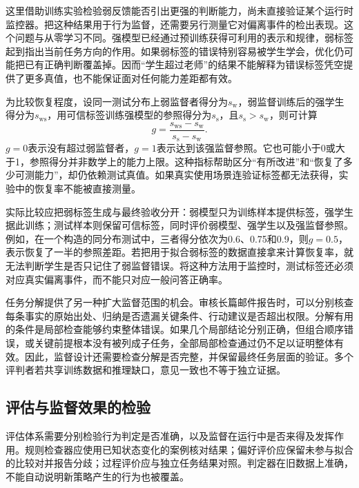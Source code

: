 这里借助训练实验检验弱反馈能否引出更强的判断能力，尚未直接验证某个运行时监控器。把这种结果用于行为监督，还需要另行测量它对偏离事件的检出表现。这个问题与从零学习不同。强模型已经通过预训练获得可利用的表示和规律，弱标签起到指出当前任务方向的作用。如果弱标签的错误特别容易被学生学会，优化仍可能把已有正确判断覆盖掉。因而“学生超过老师”的结果不能解释为错误标签凭空提供了更多真值，也不能保证面对任何能力差距都有效。

为比较恢复程度，设同一测试分布上弱监督者得分为$s_{\mathrm{w}}$，弱监督训练后的强学生得分为$s_{\mathrm{ws}}$，用可信标签训练强模型的参照得分为$s_{\mathrm{s}}$，且$s_{\mathrm{s}}>s_{\mathrm{w}}$，则可计算
\begin{equation}
 g=\frac{s_{\mathrm{ws}}-s_{\mathrm{w}}}
          {s_{\mathrm{s}}-s_{\mathrm{w}}}.
 \label{eq:alignment-weak-strong-recovery}
\end{equation}
$g=0$表示没有超过弱监督者，$g=1$表示达到该强监督参照。它也可能小于0或大于1，参照得分并非数学上的能力上限。这种指标帮助区分“有所改进”和“恢复了多少可测能力”，却仍依赖测试真值。如果真实使用场景连验证标签都无法获得，实验中的恢复率不能被直接测量。

实际比较应把弱标签生成与最终验收分开：弱模型只为训练样本提供标签，强学生据此训练；测试样本则保留可信标签，同时评价弱模型、强学生以及强监督参照。例如，在一个构造的同分布测试中，三者得分依次为0.6、0.75和0.9，则$g=0.5$，表示恢复了一半的参照差距。若把用于拟合弱标签的数据直接拿来计算恢复率，就无法判断学生是否只记住了弱监督错误。将这种方法用于监控时，测试标签还必须对应真实偏离事件，而不能只对应一般问答正确率。

任务分解提供了另一种扩大监督范围的机会。审核长篇邮件报告时，可以分别核查每条事实的原始出处、归纳是否遗漏关键条件、行动建议是否超出权限。分解有用的条件是局部检查能够约束整体错误。如果几个局部结论分别正确，但组合顺序错误，或关键前提根本没有被列成子任务，全部局部检查通过仍不足以证明整体有效。因此，监督设计还需要检查分解是否完整，并保留最终任务层面的验证。多个评判者若共享训练数据和推理缺口，意见一致也不等于独立证据。

\subsection{评估与监督效果的检验}
\label{sec:alignment-oversight-validation}

评估体系需要分别检验行为判定是否准确，以及监督在运行中是否来得及发挥作用。规则检查器应使用已知状态变化的案例核对结果；偏好评价应保留未参与拟合的比较对并报告分歧；过程评价应与独立任务结果对照。判定器在旧数据上准确，不能自动说明新策略产生的行为也被覆盖。

